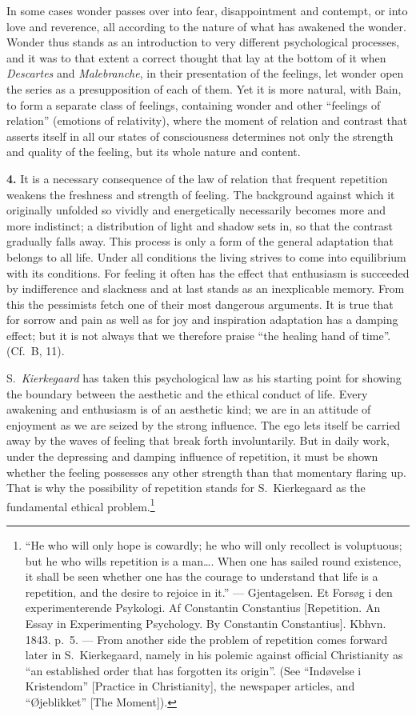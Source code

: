 \documentclass[12pt,a4paper]{book}
\newcommand{\opage}[1]{\marginnote{\footnotesize\textit{[#1]}}}
\begin{document}
In some cases wonder passes over into fear, disappointment and contempt,
or into love and reverence, all according to the nature of what has
awakened the wonder. Wonder thus stands as an introduction to very
different psychological processes, and it was to that extent a correct
thought that lay at the bottom of it
\opage{331}when \emph{Descartes} and \emph{Malebranche}, in their
presentation of the feelings, let wonder open the series as a
presupposition of each of them. Yet it is more natural, with Bain, to
form a separate class of feelings, containing wonder and other
``feelings of relation'' (emotions of relativity), where the moment of
relation and contrast that asserts itself in all our states of
consciousness determines not only the strength and quality of the
feeling, but its whole nature and content.

\textbf{4.} It is a necessary consequence of the law of relation that
frequent repetition weakens the freshness and strength of feeling. The
background against which it originally unfolded so vividly and
energetically necessarily becomes more and more indistinct; a
distribution of light and shadow sets in, so that the contrast gradually
falls away. This process is only a form of the general adaptation that
belongs to all life. Under all conditions the living strives to come
into equilibrium with its conditions. For feeling it often has the
effect that enthusiasm is succeeded by indifference and slackness and at
last stands as an inexplicable memory. From this the pessimists fetch
one of their most dangerous arguments. It is true that for sorrow and
pain as well as for joy and inspiration adaptation has a damping effect;
but it is not always that we therefore praise ``the healing hand of
time''. (Cf.\ B, 11).

S.~\emph{Kierkegaard} has taken this psychological law as his starting
point for showing the boundary between the aesthetic and the ethical
conduct of life. Every awakening and enthusiasm is of an aesthetic kind;
we are in an attitude of enjoyment as we are seized by the strong
influence. The ego lets itself be carried away by the waves of feeling
that break forth involuntarily. But in daily work, under the depressing
and damping influence of repetition, it must be shown whether the
feeling possesses any other strength than that momentary flaring up.
That is why the possibility of repetition stands for S.~Kierkegaard as
the fundamental ethical
problem.\footnote{``He who will only hope is cowardly; he who will only
recollect is voluptuous; but he who wills repetition is a man\ldots.
When one has sailed round existence, it shall be seen whether one has
the courage to understand that life is a repetition, and the desire to
rejoice in it.'' --- Gjentagelsen. Et Forsøg i den experimenterende
Psykologi. Af Constantin Constantius [Repetition. An Essay in
Experimenting Psychology. By Constantin Constantius]. Kbhvn. 1843. p.~5.
--- From another side the problem of repetition comes forward later in
S.~Kierkegaard, namely in his polemic against official Christianity as
``an established order that has forgotten its origin''. (See
``Indøvelse i Kristendom'' [Practice in Christianity], the newspaper
articles, and ``Øjeblikket'' [The Moment]).}
\end{document}
